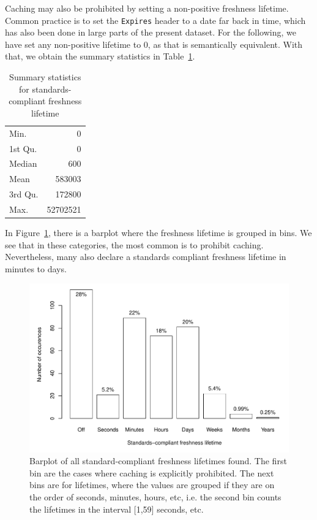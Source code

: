 \documentclass{llncs}
\newcommand{\httph}[1]{\texttt{#1}}
\begin{document}
Caching may also be prohibited by setting a non-positive freshness
lifetime. Common practice is to set the \httph{Expires} header to a
date far back in time, which has also been done in large parts of the
present dataset. For the following, we have set any non-positive
lifetime to 0, as that is semantically equivalent. With that, we
obtain the summary statistics in Table~\ref{tab:summaryhard}. 

\begin{table}[ht]
\begin{center}
\caption{Summary statistics for standards-compliant freshness lifetime}\label{tab:summaryhard}
\begin{tabular}{lr}
Min.   &       0   \\ 
1st Qu.&       0   \\ 
Median &     600   \\ 
Mean   &  583003   \\ 
3rd Qu.&  172800   \\ 
Max.   & 52702521   \\ 
   \hline
\end{tabular}
\end{center}
\end{table}

In Figure~\ref{fig:hardall}, there is a barplot where
the freshness lifetime is grouped in bins. We see that in these
categories, the most common is to prohibit caching. Nevertheless, many
also declare a standards compliant freshness lifetime in minutes to
days.

\begin{figure}[ht!]
  \centerline{%
    \includegraphics[width=.9\textwidth]{hardall.pdf}}
  \caption{Barplot of all standard-compliant freshness lifetimes
    found. The first bin are the cases where caching is explicitly
    prohibited. The next bins are for lifetimes, where the values are
    grouped if they are on the order of seconds, minutes, hours, etc,
    i.e. the second bin counts the lifetimes in the interval [1,59]
    seconds, etc.}
  \label{fig:hardall}
\end{figure}
\end{document}
